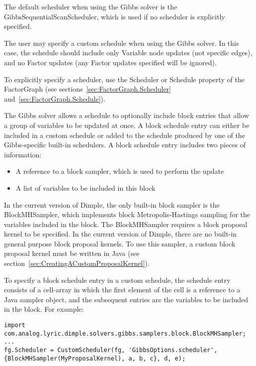 The default scheduler when using the Gibbs solver is the GibbsSequentialScanScheduler, which is used if no scheduler is explicitly specified.

The user may specify a custom schedule when using the Gibbs solver.  In this case, the schedule should include only Variable node updates (not specific edges), and no Factor updates (any Factor updates specified will be ignored).

To explicitly specify a scheduler, use the Scheduler or Schedule property of the FactorGraph (see sections~\ref{sec:FactorGraph.Scheduler} and~\ref{sec:FactorGraph.Schedule}).

\label{sec:BlockScheduleEntries}

The Gibbs solver allows a schedule to optionally include block entries that allow a group of variables to be updated at once.  A block schedule entry can either be included in a custom schedule or added to the schedule produced by one of the Gibbs-specific built-in schedulers.  A block schedule entry includes two pieces of information:
%
\begin{itemize}
\item A reference to a block sampler, which is used to perform the update
\item A list of variables to be included in this block
\end{itemize}

In the current version of Dimple, the only built-in block sampler is the BlockMHSampler, which implements block Metropolis-Hastings sampling for the variables included in the block.  The BlockMHSampler requires a block proposal kernel to be specified.  In the current version of Dimple, there are no built-in general purpose block proposal kernels.  To use this sampler, a custom block proposal kernel must be written \ifmatlab in Java \fi (see section~\ref{sec:CreatingACustomProposalKernel}).

\ifmatlab
To specify a block schedule entry in a custom schedule, the schedule entry consists of a cell-array in which the first element of the cell is a reference to a Java sampler object, and the subsequent entries are the variables to be included in the block.  For example:

\begin{lstlisting}
import com.analog.lyric.dimple.solvers.gibbs.samplers.block.BlockMHSampler;
...
fg.Scheduler = CustomScheduler(fg, 'GibbsOptions.scheduler', {BlockMHSampler(MyProposalKernel), a, b, c}, d, e);
\end{lstlisting}
\fi

